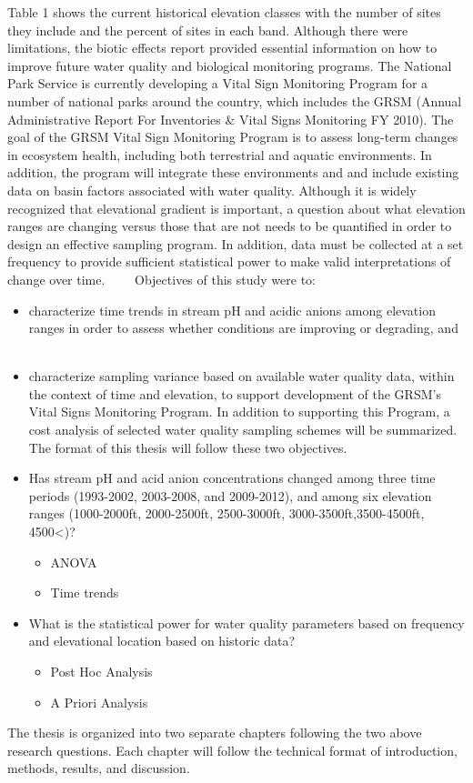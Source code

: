 Table 1 shows the current historical elevation classes with the number of sites they include and the percent of sites in each band.  Although there were limitations, the biotic effects report provided essential information on how to improve future water quality and biological monitoring programs.
The National Park Service is currently developing a Vital Sign Monitoring Program for a number of national parks around the country, which includes the GRSM (Annual Administrative Report For Inventories & Vital Signs Monitoring FY 2010).  The goal of the GRSM Vital Sign Monitoring Program is to assess long-term changes in ecosystem health, including both terrestrial and aquatic environments. In addition, the program will integrate these environments and and include existing data on basin factors associated with water quality.   Although it is widely recognized that elevational gradient is important, a question about what elevation ranges are changing versus those that are not needs to be quantified in order to design an effective sampling program.  In addition, data must be collected at a set frequency to provide sufficient statistical power to make valid interpretations of change over time. 
　　Objectives of this study were to:
　　\begin{itemize}
　　\item  characterize time trends in stream pH and acidic anions among elevation ranges in order to assess whether conditions are improving or degrading, and 
　　\item characterize sampling variance based on available water quality data, within the context of time and elevation, to support development of the GRSM’s Vital Signs Monitoring Program.  In addition to supporting this Program, a cost analysis of selected water quality sampling schemes will be summarized.  The format of this thesis will follow these two objectives.  
\end{itemize}
\begin{itemize}
\item Has stream pH and acid anion concentrations changed among three time periods (1993-2002, 2003-2008, and 2009-2012), and among six elevation ranges (1000-2000ft, 2000-2500ft, 2500-3000ft, 3000-3500ft,3500-4500ft, 4500<)?
\begin{itemize}
 \item ANOVA
\item Time trends
\end{itemize}
\item What is the statistical power for water quality parameters based on frequency and elevational location based on historic data?
\begin{itemize}
\item Post Hoc Analysis
\item A Priori Analysis
\end{itemize}
\end{itemize}
The thesis is organized into two separate chapters following the two above research questions. Each chapter will follow the technical format of introduction, methods, results, and discussion.  